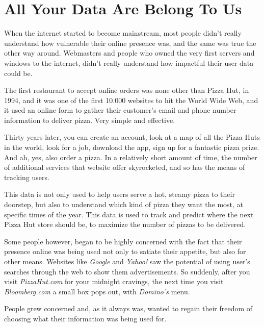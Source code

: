 \section{All Your Data Are Belong To Us}

When the internet started to become mainstream, most people didn't really understand how vulnerable their online presence was, and the same was true the other way around. Webmasters and people who owned the very first servers and windows to the internet, didn't really understand how impactful their user data could be.

The first restaurant to accept online orders was none other than Pizza Hut, in 1994, and it was one of the first 10.000 websites to hit the World Wide Web, and it used an online form to gather their customer's email and phone number information to deliver pizza. Very simple and effective.

Thirty years later, you can create an account, look at a map of all the Pizza Huts in the world, look for a job, download the app, sign up for a fantastic pizza prize. And ah, yes, also order a pizza. In a relatively short amount of time, the number of additional services that website offer skyrocketed, and so has the means of tracking users.

This data is not only used to help users serve a hot, steamy pizza to their doorstep, but also to understand which kind of pizza they want the most, at specific times of the year. This data is used to track and predict where the next Pizza Hut store should be, to maximize the number of pizzas to be delivered.

Some people however, began to be highly concerned with the fact that their presence online was being used not only to satiate their appetite, but also for other means. Websites like \textit{Google} and \textit{Yahoo!} saw the potential of using user's searches through the web to show them advertisements. So suddenly, after you visit \textit{PizzaHut.com} for your midnight cravings, the next time you visit \textit{Bloomberg.com} a small box pops out, with \textit{Domino's} menu.

People grew concerned and, as it always was, wanted to regain their freedom of choosing what their information was being used for.
